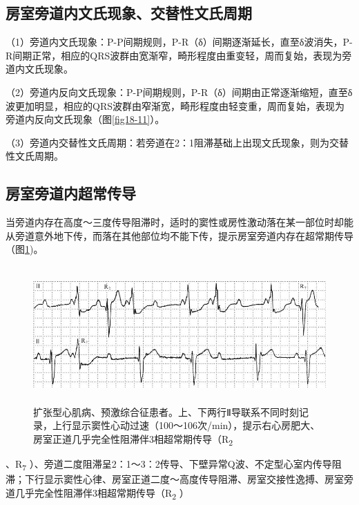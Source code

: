 \protect\hypertarget{text00036.htmlux5cux23subid426}{}{}

\subsection{房室旁道内文氏现象、交替性文氏周期}

（1）旁道内文氏现象：P-P间期规则，P-R（δ）间期逐渐延长，直至δ波消失，P-R间期正常，相应的QRS波群由宽渐窄，畸形程度由重变轻，周而复始，表现为旁道内文氏现象。

（2）旁道内反向文氏现象：P-P间期规则，P-R（δ）间期由正常逐渐缩短，直至δ波更加明显，相应的QRS波群由窄渐宽，畸形程度由轻变重，周而复始，表现为旁道内反向文氏现象（图\ref{fig18-11}）。

（3）旁道内交替性文氏周期：若旁道在2：1阻滞基础上出现文氏现象，则为交替性文氏周期。

\protect\hypertarget{text00036.htmlux5cux23subid427}{}{}

\subsection{房室旁道内超常传导}

当旁道内存在高度～三度传导阻滞时，适时的窦性或房性激动落在某一部位时却能从旁道意外地下传，而落在其他部位均不能下传，提示房室旁道内存在超常期传导（图\ref{fig29-8})。

\begin{figure}[!htbp]
 \centering
 \includegraphics[width=5.61458in,height=2.05208in]{./images/Image00492.jpg}
 \captionsetup{justification=centering}
 \caption{扩张型心肌病、预激综合征患者。上、下两行Ⅱ导联系不同时刻记录，上行显示窦性心动过速（100～106次/min），提示右心房肥大、房室正道几乎完全性阻滞伴3相超常期传导（R\textsubscript{2}}
 \label{fig29-8}
  \end{figure} 
、R\textsubscript{7}
）、旁道二度阻滞呈2：1～3：2传导、下壁异常Q波、不定型心室内传导阻滞；下行显示窦性心律、房室正道二度～高度传导阻滞、房室交接性逸搏、房室旁道几乎完全性阻滞伴3相超常期传导（R\textsubscript{2}
）

